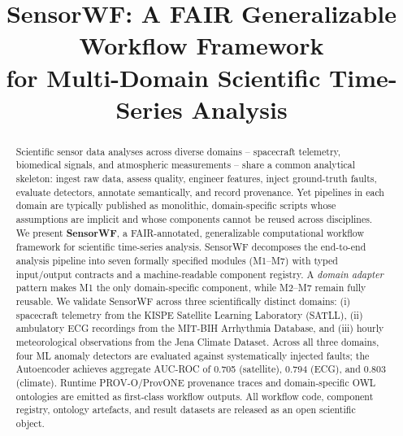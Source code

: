 \documentclass[conference]{IEEEtran}
\begin{document}
\title{SensorWF: A FAIR Generalizable Workflow Framework\\for Multi-Domain Scientific Time-Series Analysis}

\author{
}

\maketitle

\begin{abstract}
Scientific sensor data analyses across diverse domains -- spacecraft telemetry,
biomedical signals, and atmospheric measurements -- share a common analytical
skeleton: ingest raw data, assess quality, engineer features, inject ground-truth
faults, evaluate detectors, annotate semantically, and record provenance. Yet
pipelines in each domain are typically published as monolithic, domain-specific
scripts whose assumptions are implicit and whose components cannot be reused
across disciplines. We present \textbf{SensorWF}, a FAIR-annotated, generalizable
computational workflow framework for scientific time-series analysis. SensorWF
decomposes the end-to-end analysis pipeline into seven formally specified modules
(M1--M7) with typed input/output contracts and a machine-readable component
registry. A \emph{domain adapter} pattern makes M1 the only domain-specific
component, while M2--M7 remain fully reusable. We validate SensorWF across three
scientifically distinct domains: (i) spacecraft telemetry from the KISPE
Satellite Learning Laboratory (SATLL), (ii) ambulatory ECG recordings from the
MIT-BIH Arrhythmia Database, and (iii) hourly meteorological observations from
the Jena Climate Dataset. Across all three domains, four ML anomaly detectors
are evaluated against systematically injected faults; the Autoencoder achieves
aggregate AUC-ROC of 0.705 (satellite), 0.794 (ECG), and 0.803 (climate).
Runtime PROV-O/ProvONE provenance traces and domain-specific OWL ontologies are
emitted as first-class workflow outputs. All workflow code, component registry,
ontology artefacts, and result datasets are released as an open scientific object.
\end{abstract}
\end{document}
